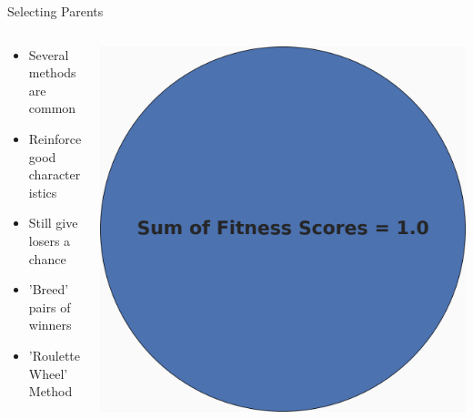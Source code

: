 \documentclass[10pt]{beamer}
\begin{document}
\begin{frame}{Selecting Parents}
	\begin{columns}[c] %
		\begin{column}{.48\textwidth}
			\begin{itemize}[<+->]
				\item {Several methods are common}
				\item {Reinforce good characteristics}
				\item {Still give losers a chance}
				\item {'Breed' pairs of winners}
				\item {'Roulette Wheel' Method}
			\end{itemize}
		\end{column}
		\hfill
		\begin{column}{0.48\textwidth}
		    \begin{overprint}
			    \includegraphics[width=\linewidth]{images/pie0.PNG}

\end{overprint}
\end{column}
\end{columns}
\end{frame}
\end{document}
